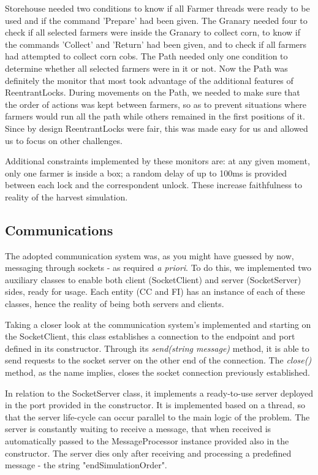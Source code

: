 \documentclass[12pt]{article}
\begin{document}
Storehouse needed two conditions to know if all Farmer threads were ready to be used and if the command 'Prepare' had been given.
The Granary needed four to check if all selected farmers were inside the Granary to collect corn, to know if the commands 'Collect' and 'Return' had 
been given, and to check if all farmers had attempted to collect corn cobs.
The Path needed only one condition to determine whether all selected farmers were in it or not.
Now the Path was definitely the monitor that most took advantage of the additional features of ReentrantLocks.
During movements on the Path, we needed to make sure that the order of actions was kept between farmers, so as to prevent situations where farmers would run all 
the path while others remained in the first positions of it.
Since by design ReentrantLocks were fair, this was made easy for us and allowed us to focus on other challenges.

Additional constraints implemented by these monitors are: at any given moment, only one farmer is inside a box; a random delay of up to 100ms is provided 
between each lock and the correspondent unlock.
These increase faithfulness to reality of the harvest simulation.

\subsection{Communications} \label{communications} %

The adopted communication system was, as you might have guessed by now, messaging through sockets - as required \textit{a priori}. %
To do this, we implemented two auxiliary classes to enable both client (SocketClient) and server (SocketServer) sides, ready for usage. 
Each entity (CC and FI) has an instance of each of these classes, hence the reality of being both servers and clients.

Taking a closer look at the communication system's implemented and starting on the SocketClient, this class establishes a connection to the endpoint and port 
defined in its constructor.
Through its \textit{send(string message)} method, it is able to send requests to the socket server on the other end of the connection.
The \textit{close()} method, as the name implies, closes the socket connection previously established.

In relation to the SocketServer class, it implements a ready-to-use server deployed in the port provided in the constructor. 
It is implemented based on a thread, so that the server life-cycle can occur parallel to the main logic of the problem. 
The server is constantly waiting to receive a message, that when received is automatically passed to the MessageProcessor instance provided also in the constructor. 
The server dies only after receiving and processing a predefined message - the string "endSimulationOrder".
\end{document}
